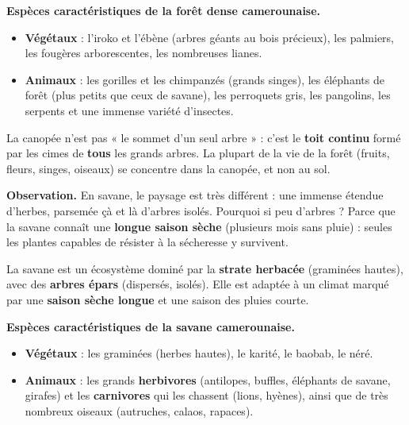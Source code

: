 \documentclass[11pt]{article}
\newcommand{\cle}[1]{{\popxbold\color{popdark}#1}}
\newcounter{popsec}
\newcounter{popsub}
\newcommand{\courssub}[1]{%
  \stepcounter{popsub}%
  \par\vspace{9pt}\noindent{\popxbold\fontsize{11.5}{13}\selectfont\color{popink}{\color{poporange}\thepopsec.\thepopsub}\hspace{6pt}#1}\par\nopagebreak\vspace{4pt}
}
\begin{document}
\textbf{Espèces caractéristiques de la forêt dense camerounaise.}
\begin{itemize}
\item \textbf{Végétaux} : l'\cle{iroko} et l'\cle{ébène} (arbres géants au bois précieux), les palmiers, les fougères arborescentes, les nombreuses lianes.
\item \textbf{Animaux} : les \cle{gorilles} et les \cle{chimpanzés} (grands singes), les \cle{éléphants de forêt} (plus petits que ceux de savane), les perroquets gris, les pangolins, les serpents et une immense variété d'insectes.
\end{itemize}

\begin{attention}
La canopée n'est pas « le sommet d'un seul arbre » : c'est le \textbf{toit continu} formé par les cimes de \textbf{tous} les grands arbres. La plupart de la vie de la forêt (fruits, fleurs, singes, oiseaux) se concentre dans la canopée, et non au sol.
\end{attention}

\courssub{La biodiversité de la savane}

\textbf{Observation.} En savane, le paysage est très différent : une immense étendue d'herbes, parsemée çà et là d'arbres isolés. Pourquoi si peu d'arbres ? Parce que la savane connaît une \textbf{longue saison sèche} (plusieurs mois sans pluie) : seules les plantes capables de résister à la sécheresse y survivent.

\begin{definition}[La savane]
La \cle{savane} est un écosystème dominé par la \textbf{strate herbacée} (graminées hautes), avec des \textbf{arbres épars} (dispersés, isolés). Elle est adaptée à un climat marqué par une \textbf{saison sèche longue} et une saison des pluies courte.
\end{definition}

\textbf{Espèces caractéristiques de la savane camerounaise.}
\begin{itemize}
\item \textbf{Végétaux} : les graminées (herbes hautes), le \cle{karité}, le \cle{baobab}, le \cle{néré}.
\item \textbf{Animaux} : les grands \textbf{herbivores} (\cle{antilopes}, \cle{buffles}, éléphants de savane, girafes) et les \textbf{carnivores} qui les chassent (\cle{lions}, hyènes), ainsi que de très nombreux oiseaux (autruches, calaos, rapaces).
\end{itemize}
\end{document}
